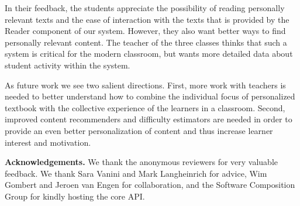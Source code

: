 In their feedback, the students appreciate the possibility of reading personally relevant texts and the ease of interaction with the texts that is provided by the Reader component of our system. However, they also want better ways to find personally relevant content. The teacher of the three classes thinks that such a system is critical for the modern classroom, but wants more detailed data about student activity within the system.

As future work we see two salient directions. First, more work with teachers is needed to better understand how to combine the individual focus of personalized textbook with the collective experience of the learners in a classroom.
Second, improved content recommenders and difficulty estimators are needed in order to provide an even better personalization of content and thus increase learner interest and motivation.



{\footnotesize
	{\bf Acknowledgements.} We thank the anonymous reviewers for very valuable feedback. We thank Sara Vanini and Mark Langheinrich for advice, 
	 Wim Gombert and Jeroen van Engen for collaboration,
	 and the Software Composition Group for kindly hosting the core API.
}